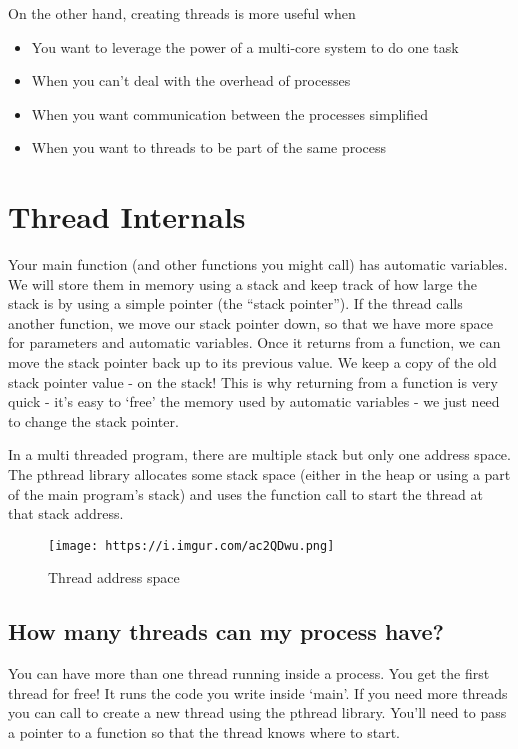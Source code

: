 On the other hand, creating threads is more useful when
\begin{itemize}
\tightlist
\item You want to leverage the power of a multi-core system to do one task
\item When you can't deal with the overhead of processes
\item When you want communication between the processes simplified
\item When you want to threads to be part of the same process
\end{itemize}

\section{Thread Internals}

Your main function (and other functions you might call) has automatic variables. We will store them in memory using a stack and keep track of how large the stack is by using a simple pointer (the ``stack pointer''). If the thread calls another function, we move our stack pointer down, so that we have more space for parameters and automatic variables. Once it returns from a function, we can move the stack pointer back up to its previous value. We keep a copy of the old stack pointer value - on the stack! This is why returning from a function is very quick - it's easy to `free' the memory used by automatic variables - we just need to change the stack pointer.

In a multi threaded program, there are multiple stack but only one address space. The pthread library allocates some stack space (either in the heap or using a part of the main program's stack) and uses the  function call to start the thread at that stack address.

\begin{figure}[htbp]
\centering
\texttt{[image: https://i.imgur.com/ac2QDwu.png]}
\caption{Thread address space}
\end{figure}

\subsection{How many threads can my process have?}\label{how-many-threads-can-my-process-have}

You can have more than one thread running inside a process. You get the first thread for free! It runs the code you write inside `main'. If you need more threads you can call  to create a new thread using the pthread library. You'll need to pass a pointer to a function so that the thread knows where to start.

